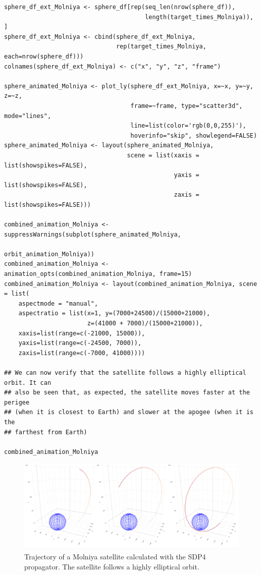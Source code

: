 \begin{verbatim}
sphere_df_ext_Molniya <- sphere_df[rep(seq_len(nrow(sphere_df)),
                                       length(target_times_Molniya)), ]
sphere_df_ext_Molniya <- cbind(sphere_df_ext_Molniya,
                               rep(target_times_Molniya, each=nrow(sphere_df)))
colnames(sphere_df_ext_Molniya) <- c("x", "y", "z", "frame")

sphere_animated_Molniya <- plot_ly(sphere_df_ext_Molniya, x=~x, y=~y, z=~z,
                                   frame=~frame, type="scatter3d", mode="lines",
                                   line=list(color='rgb(0,0,255)'),
                                   hoverinfo="skip", showlegend=FALSE)
sphere_animated_Molniya <- layout(sphere_animated_Molniya,
                                  scene = list(xaxis = list(showspikes=FALSE), 
                                               yaxis = list(showspikes=FALSE),
                                               zaxis = list(showspikes=FALSE)))

combined_animation_Molniya <- suppressWarnings(subplot(sphere_animated_Molniya,
                                                       orbit_animation_Molniya))
combined_animation_Molniya <- animation_opts(combined_animation_Molniya, frame=15)
combined_animation_Molniya <- layout(combined_animation_Molniya, scene = list(
    aspectmode = "manual",
    aspectratio = list(x=1, y=(7000+24500)/(15000+21000), 
                       z=(41000 + 7000)/(15000+21000)),
    xaxis=list(range=c(-21000, 15000)),
    yaxis=list(range=c(-24500, 7000)),
    zaxis=list(range=c(-7000, 41000))))

## We can now verify that the satellite follows a highly elliptical orbit. It can
## also be seen that, as expected, the satellite moves faster at the perigee
## (when it is closest to Earth) and slower at the apogee (when it is the
## farthest from Earth)

combined_animation_Molniya
\end{verbatim}

\begin{figure}[H]

{\centering \includegraphics[width=0.99\linewidth]{static/Molniya_static} 

}

\caption{Trajectory of a Molniya satellite calculated with the SDP4 propagator. The satellite follows a highly elliptical orbit.}\label{fig:sdp4-Molniya-figure-static}
\end{figure}

